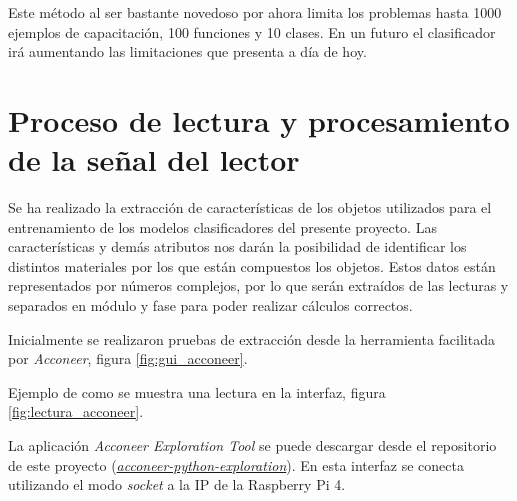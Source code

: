 Este método al ser bastante novedoso por ahora limita los problemas hasta 1000 ejemplos de capacitación, 100 funciones y 10 clases. En un futuro el clasificador irá aumentando las limitaciones que presenta a día de hoy.

\section{Proceso de lectura y procesamiento de la señal del lector}

Se ha realizado la extracción de características de los objetos utilizados para el entrenamiento de los modelos clasificadores del presente proyecto. Las características y demás atributos nos darán la posibilidad de identificar los distintos materiales por los que están compuestos los objetos. Estos datos están representados por números complejos, por lo que serán extraídos de las lecturas y separados en módulo y fase para poder realizar cálculos correctos.

Inicialmente se realizaron pruebas de extracción desde la herramienta facilitada por \textit{Acconeer}, figura \ref{fig:gui_acconeer}.


Ejemplo de como se muestra una lectura en la interfaz, figura \ref{fig:lectura_acconeer}.


La aplicación \textit{Acconeer Exploration Tool} se puede descargar desde el repositorio de este proyecto (\href{https://github.com/mecyc/TFG_RADAR_60GHZ/tree/main/acconeer-python-exploration}{\textit{acconeer-python-exploration}}). En esta interfaz se conecta utilizando el modo \textit{socket} a la IP de la Raspberry Pi 4.
 
